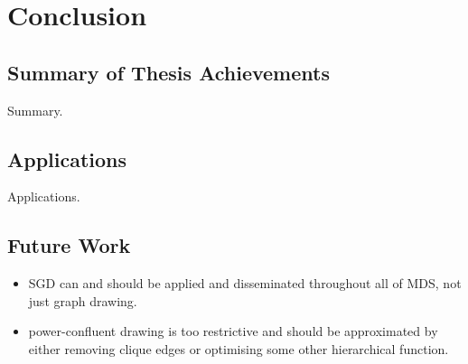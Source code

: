 \chapter{Conclusion}

\label{ch:conclusions}

\section{Summary of Thesis Achievements}

Summary.


\section{Applications}

Applications.


\section{Future Work}
\begin{itemize}
    \item SGD can and should be applied and disseminated throughout all of MDS, not just graph drawing.
    \item power-confluent drawing is too restrictive and should be approximated by either removing clique edges or optimising some other hierarchical function. 
\end{itemize}
